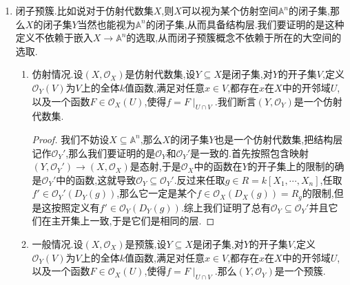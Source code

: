 \begin{enumerate}
\begin{enumerate}
\begin{proof}
    		第二个命题是容易的,按照$k[X_1,\cdots,X_{n+1}]/\mathfrak{b}=(k[X])_f$,从右侧是整环得到左侧是整环,于是$\mathfrak{b}$是素理想.至于第一个命题,定义$\alpha:(Y,\mathscr{O}_Y)\to(X,\mathscr{O}_X)$为$(x_1,\cdots,x_n,x_{n+1})\mapsto(x_1,\cdots,x_n)$,这是一个正则单映射,它的像集恰好是$D(f)$.容易构造逆映射$(D(f),\mathscr{O}_X\mid_{D(f)})\to(Y,\mathscr{O}_Y)$为$(x_1,\cdots,x_n)\mapsto(x_1,\cdots,x_n,1/f_1(x_1,\cdots,x_n))$.得到这个同构.
    	\end{proof}
        \item 如果$(X,\mathscr{O}_X)$是预簇,设$U\subseteq X$是开集,那么$(U,\mathscr{O}_X\mid_U)$也是预簇,这称为$X$在开子集$U$上的开子预簇.另外明显的$X$的不可约性和诺特性都可以传递给$U$.
        \begin{proof}
        	
        	按照定义$X$被一族仿射代数集$\{U_i\}$覆盖,上一条告诉我们仿射代数集的主开集都是仿射代数集,于是仿射代数集有仿射开子集构成的拓扑基,于是每个$U\cap U_i$都可以被一族仿射代数集覆盖,进而$U$可以被一族仿射代数集覆盖.
        \end{proof}
    \end{enumerate}
    \item 闭子预簇.比如说对于仿射代数集$X$,则$X$可以视为某个仿射空间$\mathbb{A}^n$的闭子集,那么$X$的闭子集$Y$当然也能视为$\mathbb{A}^n$的闭子集,从而具备结构层.我们要证明的是这种定义不依赖于嵌入$X\to\mathbb{A}^n$的选取,从而闭子预簇概念不依赖于所在的大空间的选取.
    \begin{enumerate}
    	\item 仿射情况.设$(X,\mathscr{O}_X)$是仿射代数集,设$Y\subseteq X$是闭子集,对$Y$的开子集$V$,定义$\mathscr{O}_Y(V)$为$V$上的全体$k$值函数,满足对任意$x\in V$,都存在$x$在$X$中的开邻域$U$,以及一个函数$F\in\mathscr{O}_X(U)$,使得$f=F\mid_{U\cap V}$.我们断言$(Y,\mathscr{O}_Y)$是一个仿射代数集.
    	\begin{proof}
    		
    		我们不妨设$X\subseteq\mathbb{A}^n$,那么$X$的闭子集$Y$也是一个仿射代数集,把结构层记作$\mathscr{O}_Y'$,那么我们要证明的是$\mathscr{O}_Y$和$\mathscr{O}_Y'$是一致的.首先按照包含映射$(Y,\mathscr{O}_Y')\to(X,\mathscr{O}_X)$是态射,于是$\mathscr{O}_X$中的函数在$Y$的开子集上的限制的确是$\mathscr{O}_Y'$中的函数,这就导致$\mathscr{O}_Y\subseteq\mathscr{O}_Y'$.反过来任取$g\in R=k[X_1,\cdots,X_n]$,任取$f'\in\mathscr{O}_Y'(D_Y(g))$,那么它一定是某个$f\in\mathscr{O}_X(D_X(g))=R_g$的限制,但是这按照定义有$f'\in\mathscr{O}_Y(D_Y(g))$.综上我们证明了总有$\mathscr{O}_Y\subseteq\mathscr{O}_Y'$并且它们在主开集上一致,于是它们是相同的层.
    	\end{proof}
        \item 一般情况.设$(X,\mathscr{O}_X)$是预簇,设$Y\subseteq X$是闭子集,对$Y$的开子集$V$,定义$\mathscr{O}_Y(V)$为$V$上的全体$k$值函数,满足对任意$x\in V$,都存在$x$在$X$中的开邻域$U$,以及一个函数$F\in\mathscr{O}_X(U)$,使得$f=F\mid_{U\cap V}$.那么$(Y,\mathscr{O}_Y)$是一个预簇.
    \end{enumerate}
\end{enumerate}

